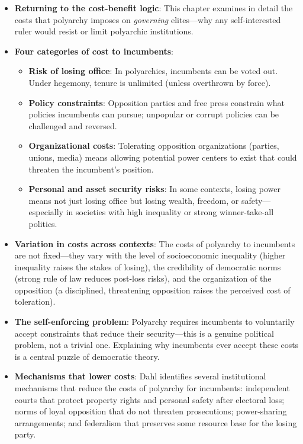 \documentclass[12pt]{article}
\begin{document}
\begin{itemize}[leftmargin=*, itemsep=4pt]
    \item \textbf{Returning to the cost-benefit logic}: This chapter examines in detail the costs that polyarchy imposes on \emph{governing} elites---why any self-interested ruler would resist or limit polyarchic institutions.
    \item \textbf{Four categories of cost to incumbents}:
        \begin{itemize}
            \item \textbf{Risk of losing office}: In polyarchies, incumbents can be voted out. Under hegemony, tenure is unlimited (unless overthrown by force).
            \item \textbf{Policy constraints}: Opposition parties and free press constrain what policies incumbents can pursue; unpopular or corrupt policies can be challenged and reversed.
            \item \textbf{Organizational costs}: Tolerating opposition organizations (parties, unions, media) means allowing potential power centers to exist that could threaten the incumbent's position.
            \item \textbf{Personal and asset security risks}: In some contexts, losing power means not just losing office but losing wealth, freedom, or safety---especially in societies with high inequality or strong winner-take-all politics.
        \end{itemize}
    \item \textbf{Variation in costs across contexts}: The costs of polyarchy to incumbents are not fixed---they vary with the level of socioeconomic inequality (higher inequality raises the stakes of losing), the credibility of democratic norms (strong rule of law reduces post-loss risks), and the organization of the opposition (a disciplined, threatening opposition raises the perceived cost of toleration).
    \item \textbf{The self-enforcing problem}: Polyarchy requires incumbents to voluntarily accept constraints that reduce their security---this is a genuine political problem, not a trivial one. Explaining why incumbents ever accept these costs is a central puzzle of democratic theory.
    \item \textbf{Mechanisms that lower costs}: Dahl identifies several institutional mechanisms that reduce the costs of polyarchy for incumbents: independent courts that protect property rights and personal safety after electoral loss; norms of loyal opposition that do not threaten prosecutions; power-sharing arrangements; and federalism that preserves some resource base for the losing party.

\end{itemize}
\end{document}
